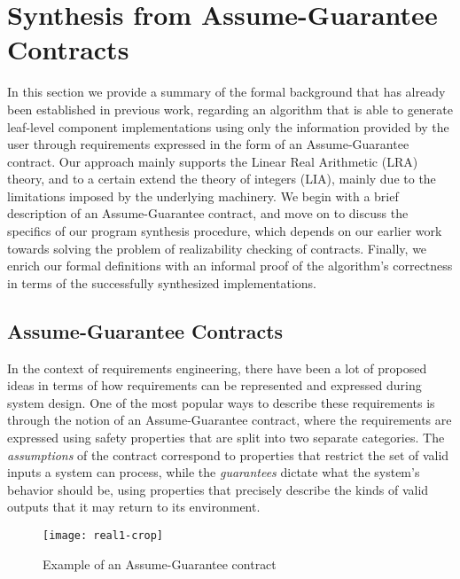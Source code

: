 \section{Synthesis from Assume-Guarantee Contracts}
\label{sec:synthesis}

In this section we provide a summary of the formal background
that has already been established in previous work, regarding an algorithm that
is able to generate leaf-level component implementations using only the
information provided by the user through requirements expressed in the form of an
Assume-Guarantee contract. Our approach mainly supports the Linear Real
Arithmetic (LRA) theory, and to a certain extend the theory of integers (LIA),
mainly due to the limitations imposed by the underlying machinery. We
begin with a brief description of an Assume-Guarantee contract, and
move on to discuss the specifics of our program synthesis procedure,
which depends on our earlier work towards solving the problem of realizability
checking of contracts.
Finally, we enrich our formal definitions with an informal proof of the
algorithm's correctness in terms of the successfully synthesized
implementations.

\subsection{Assume-Guarantee Contracts}

In the context of requirements engineering, there have been a lot of proposed
ideas in terms of how requirements can be represented and expressed during
system design. One of the most popular ways to describe these requirements is through
the notion of an Assume-Guarantee contract, where the requirements are expressed
using safety properties that are split into two separate categories. The
\textit{assumptions} of the contract correspond to properties that restrict the
set of valid inputs a system can process, while the \textit{guarantees} dictate
what the system's behavior should be, using properties that precisely describe
the kinds of valid outputs that it may return to its environment.

\begin{figure}[H]
	\centering
	\texttt{[image: real1-crop]}    	
	\caption{Example of an Assume-Guarantee contract}
	\label{fg:example}
\end{figure}

